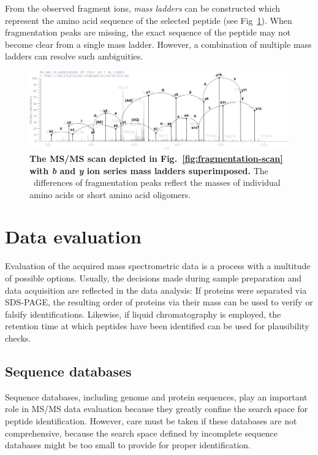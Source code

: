 From the observed fragment ions, {\em mass ladders} can be constructed which
represent the amino acid sequence of the selected peptide (see Fig~\ref{fig:fragmentation-scan-b-y}). 
When fragmentation peaks are missing, the exact sequence of the peptide may not
become clear from a single mass ladder.
However, a combination of multiple mass ladders can resolve such ambiguities.

\begin{figure}[h]
\includegraphics[width=\textwidth]{figures/ms2-scan-b-y-1.jpg}
\caption{
{\bf The MS/MS scan depicted in Fig.~\ref{fig:fragmentation-scan} with {\em b} and 
{\em y} ion series mass ladders superimposed.} 
The \mz~differences of fragmentation peaks reflect the masses of individual amino
acids or short amino acid oligomers.
}
\label{fig:fragmentation-scan-b-y}
\end{figure}


\section{Data evaluation}

Evaluation of the acquired mass spectrometric data is a process with a multitude
of possible options.
Usually, the decisions made during sample preparation and data acquisition are
reflected in the data analysis: If proteins were separated via SDS-PAGE, the
resulting order of proteins via their mass can be used to verify or falsify 
identifications.
Likewise, if liquid chromatography is employed, the retention time at which
peptides have been identified can be used for plausibility checks.

\subsection{Sequence databases}

Sequence databases, including genome and protein sequences, play an important
role in MS/MS data evaluation because they greatly confine the search space
for peptide identification.
However, care must be taken if these databases are not comprehensive, because
the search space defined by incomplete sequence databases might be too small
to provide for proper identification.

